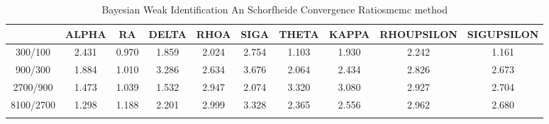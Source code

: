 \documentclass[a4paper,10pt]{article}
\begin{document}
\centering
\begin{longtable}{cccccccccc}
\toprule
 & ALPHA & RA & DELTA & RHOA & SIGA & THETA & KAPPA & RHOUPSILON & SIGUPSILON \\
\midrule
300/100 & 2.431 & 0.970 & 1.859 & 2.024 & 2.754 & 1.103 & 1.930 & 2.242 & 1.161 \\
900/300 & 1.884 & 1.010 & 3.286 & 2.634 & 3.676 & 2.064 & 2.434 & 2.826 & 2.673 \\
2700/900 & 1.473 & 1.039 & 1.532 & 2.947 & 2.074 & 3.320 & 3.080 & 2.927 & 2.704 \\
8100/2700 & 1.298 & 1.188 & 2.201 & 2.999 & 3.328 & 2.365 & 2.556 & 2.962 & 2.680 \\
\bottomrule
\caption{Bayesian Weak Identification An Schorfheide Convergence Ratiosmcmc method}
\label{table:tbl:WeakAnSchoConvergenceRatios_mcmc}
\end{longtable}
\end{document}
